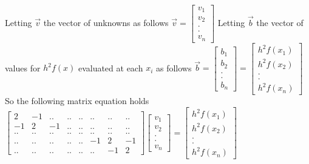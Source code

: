 \documentclass[11pt, oneside]{article}   	%
\begin{document}
Letting $\vec{v}$ the vector of unknowns as follows\newline
\newline
$\vec{v}=  \begin{bmatrix}
v_1\\
v_2\\
.\\
.\\
v_n
\end{bmatrix}$\newline
\newline
Letting $\vec{b}$ the vector of values for $h^2f(x)$ evaluated at each $x_i$ as follows\newline
\newline
$\vec{b}=  \begin{bmatrix}
b_1\\
b_2\\
.\\
.\\
b_n
\end{bmatrix}  =   \begin{bmatrix}
h^2f(x_1)\\
h^2f(x_2)\\
.\\
.\\
h^2f(x_n)
\end{bmatrix}$\newline
\newline
So the following matrix equation holds
\newline
\newline
$\begin{bmatrix}
2 & -1 & ..& ..& ..& ..& ..& ..\\
-1 & 2 & -1 & .. & ..& ..& ..& ..\\
.. & .. & ..& ..& ..& ..& ..& ..\\
.. & .. & .. & .. & .. & -1 & 2 & -1\\
.. & .. & .. & .. & .. & .. & -1 & 2
\end{bmatrix}  \begin{bmatrix}
v_1\\
v_2\\
.\\
.\\
v_n
\end{bmatrix} =  \begin{bmatrix}
h^2f(x_1)\\
h^2f(x_2)\\
.\\
.\\
h^2f(x_n)
\end{bmatrix}$\newline
\end{document}
